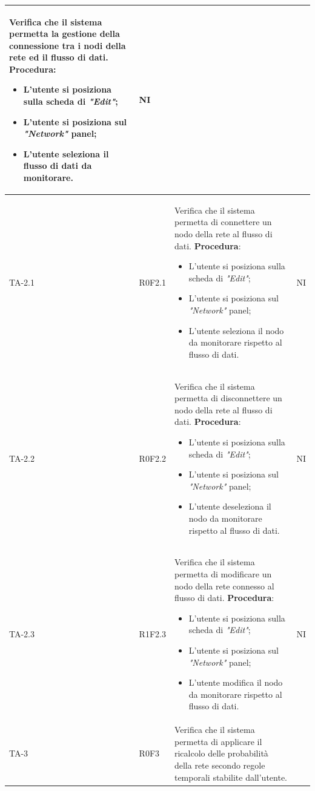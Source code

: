 \begin{longtable}{|C{2.5cm}|C{2.5cm}|L{6.5cm}|C{1.5cm}|}
	Verifica che il sistema permetta la gestione della connessione tra i nodi della rete ed il flusso di dati.
	\textbf{Procedura}:
	\begin{itemize}		
		\item L'utente si posiziona sulla scheda di \emph{"Edit"};
		\item L'utente si posiziona sul \emph{"Network"} panel;
		\item L'utente seleziona il flusso di dati da monitorare.
	\end{itemize}
	 & {NI}\\
	\hline
	{TA-2.1} & {R0F2.1} & 
	Verifica che il sistema permetta di connettere un nodo della rete al flusso di dati.
	\textbf{Procedura}:
	\begin{itemize}		
		\item L'utente si posiziona sulla scheda di \emph{"Edit"};
		\item L'utente si posiziona sul \emph{"Network"} panel;
		\item L'utente seleziona il nodo da monitorare rispetto al flusso di dati.
	\end{itemize}
	 & {NI}\\
	\hline
	{TA-2.2} & {R0F2.2} & 
	Verifica che il sistema permetta di disconnettere un nodo della rete al flusso di dati.
	\textbf{Procedura}:
	\begin{itemize}		
		\item L'utente si posiziona sulla scheda di \emph{"Edit"};
		\item L'utente si posiziona sul \emph{"Network"} panel;
		\item L'utente deseleziona il nodo da monitorare rispetto al flusso di dati.
	\end{itemize}
	 & {NI}\\
	\hline
	{TA-2.3} & {R1F2.3} & 
	Verifica che il sistema permetta di modificare un nodo della rete connesso al flusso di dati.
	\textbf{Procedura}:
	\begin{itemize}		
		\item L'utente si posiziona sulla scheda di \emph{"Edit"};
		\item L'utente si posiziona sul \emph{"Network"} panel;
		\item L'utente modifica il nodo da monitorare rispetto al flusso di dati.
	\end{itemize}
	 & {NI}\\
	\hline
	{TA-3} & {R0F3} & 
	Verifica che il sistema permetta di applicare il
	ricalcolo delle probabilità della rete
	secondo regole temporali stabilite dall'utente.

\end{longtable}
